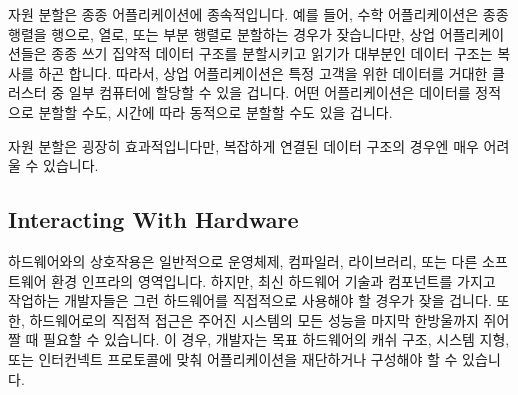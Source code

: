 자원 분할은 종종 어플리케이션에 종속적입니다.
예를 들어, 수학 어플리케이션은 종종 행렬을 행으로, 열로, 또는 부분 행렬로
분할하는 경우가 잦습니다만, 상업 어플리케이션들은 종종 쓰기 집약적 데이터
구조를 분할시키고 읽기가 대부분인 데이터 구조는 복사를 하곤 합니다.
따라서, 상업 어플리케이션은 특정 고객을 위한 데이터를 거대한 클러스터 중 일부
컴퓨터에 할당할 수 있을 겁니다.
어떤 어플리케이션은 데이터를 정적으로 분할할 수도, 시간에 따라 동적으로 분할할
수도 있을 겁니다.

자원 분할은 굉장히 효과적입니다만, 복잡하게 연결된 데이터 구조의 경우엔 매우
어려울 수 있습니다.

\subsection{Interacting With Hardware}
\label{sec:Interacting With Hardware}

하드웨어와의 상호작용은 일반적으로 운영체제, 컴파일러, 라이브러리, 또는 다른
소프트웨어 환경 인프라의 영역입니다.
하지만, 최신 하드웨어 기술과 컴포넌트를 가지고 작업하는 개발자들은 그런
하드웨어를 직접적으로 사용해야 할 경우가 잦을 겁니다.
또한, 하드웨어로의 직접적 접근은 주어진 시스템의 모든 성능을 마지막 한방울까지
쥐어짤 때 필요할 수 있습니다.
이 경우, 개발자는 목표 하드웨어의 캐쉬 구조, 시스템 지형, 또는 인터컨넥트
프로토콜에 맞춰 어플리케이션을 재단하거나 구성해야 할 수 있습니다.

